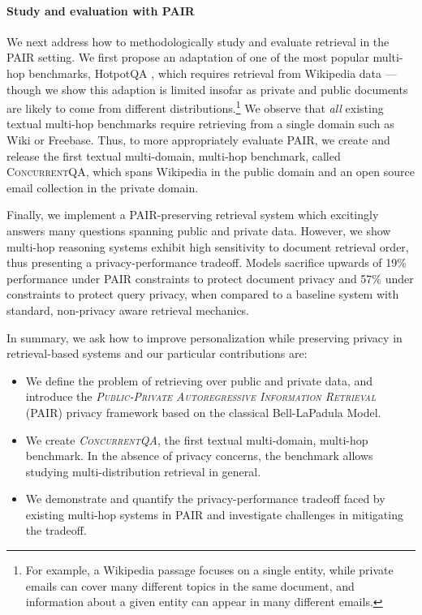 \documentclass{article}
\renewcommand\cite{\citep}	\newcommand\shortcite{\citeyearpar}\newcommand\newcite{\citet}
\newcommand{\datasetname}{\textsc{ConcurrentQA}\xspace}
\newcommand{\problemlongname}{\textsc{Public-Private Autoregressive Information Retrieval}\xspace}
\newcommand{\problemshortname}{\textsc{PAIR}\xspace}
\begin{document}
\paragraph{Study and evaluation with \problemshortname} 
We next address how to methodologically study and evaluate retrieval in the \problemshortname setting.
We first propose an adaptation of one of the most popular multi-hop benchmarks, HotpotQA \cite{yang2018hotpotqa}, which requires retrieval from Wikipedia data --- though we show this adaption is limited insofar as private and public documents are likely to come from different distributions.\footnote{For example, a Wikipedia passage focuses on a single entity, while private emails can cover many different topics in the same document, and information about a given entity can appear in many different emails.} We observe that \textit{all} existing textual multi-hop benchmarks require retrieving from a single domain such as Wiki or Freebase.
Thus, to more appropriately evaluate \problemshortname,
we create and release the first textual multi-domain, multi-hop benchmark, called \datasetname, which spans Wikipedia in the public domain and an open source email collection in the private domain. 


Finally, we implement a \problemshortname-preserving retrieval system which excitingly answers many questions spanning public and private data. However, we show multi-hop reasoning systems exhibit high sensitivity to document retrieval order, thus presenting a privacy-performance tradeoff. Models sacrifice upwards of 19\% performance under \problemshortname constraints to protect document privacy and 57\% under constraints to protect query privacy, when compared to a baseline system with standard, non-privacy aware retrieval mechanics. 



In summary, we ask how to improve personalization while preserving privacy in retrieval-based systems and our particular contributions are:

\begin{itemize}
    \item We define the problem of retrieving over public and private data, and introduce the \textit{\problemlongname} (\problemshortname) privacy framework based on the classical Bell-LaPadula Model.
    \item We create \textit{\datasetname}, the first textual multi-domain, multi-hop benchmark. In the absence of privacy concerns, the benchmark allows studying  multi-distribution retrieval in general.
    \item  We demonstrate and quantify the privacy-performance tradeoff faced by existing multi-hop systems in \problemshortname and investigate challenges in mitigating the tradeoff. 
\end{itemize}
\end{document}
